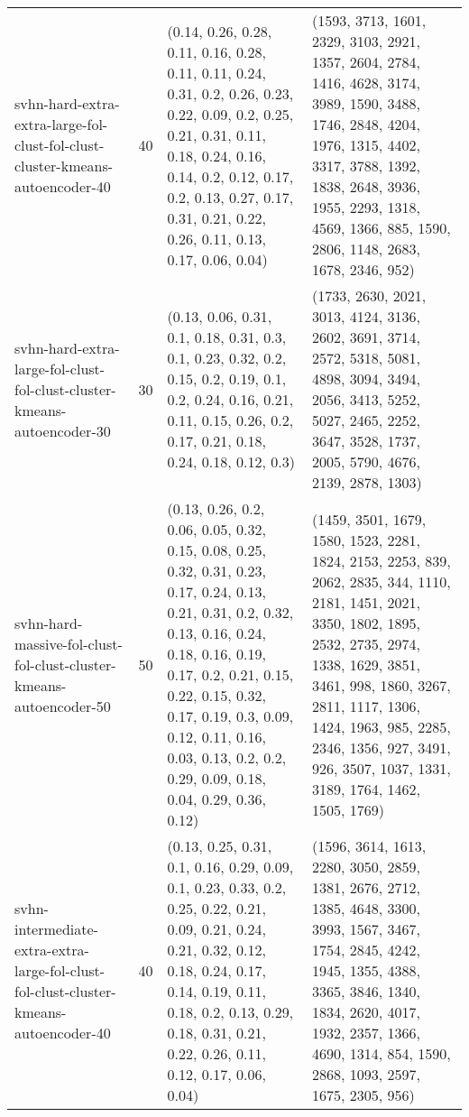 \begin{longtable}{llll}
                                svhn-hard-extra-extra-large-fol-clust-fol-clust-cluster-kmeans-autoencoder-40 &             40 &                                                              (0.14, 0.26, 0.28, 0.11, 0.16, 0.28, 0.11, 0.11, 0.24, 0.31, 0.2, 0.26, 0.23, 0.22, 0.09, 0.2, 0.25, 0.21, 0.31, 0.11, 0.18, 0.24, 0.16, 0.14, 0.2, 0.12, 0.17, 0.2, 0.13, 0.27, 0.17, 0.31, 0.21, 0.22, 0.26, 0.11, 0.13, 0.17, 0.06, 0.04) &                                                            (1593, 3713, 1601, 2329, 3103, 2921, 1357, 2604, 2784, 1416, 4628, 3174, 3989, 1590, 3488, 1746, 2848, 4204, 1976, 1315, 4402, 3317, 3788, 1392, 1838, 2648, 3936, 1955, 2293, 1318, 4569, 1366, 885, 1590, 2806, 1148, 2683, 1678, 2346, 952) \\
                                      svhn-hard-extra-large-fol-clust-fol-clust-cluster-kmeans-autoencoder-30 &             30 &                                                                                                                               (0.13, 0.06, 0.31, 0.1, 0.18, 0.31, 0.3, 0.1, 0.23, 0.32, 0.2, 0.15, 0.2, 0.19, 0.1, 0.2, 0.24, 0.16, 0.21, 0.11, 0.15, 0.26, 0.2, 0.17, 0.21, 0.18, 0.24, 0.18, 0.12, 0.3) &                                                                                                                      (1733, 2630, 2021, 3013, 4124, 3136, 2602, 3691, 3714, 2572, 5318, 5081, 4898, 3094, 3494, 2056, 3413, 5252, 5027, 2465, 2252, 3647, 3528, 1737, 2005, 5790, 4676, 2139, 2878, 1303) \\
                                          svhn-hard-massive-fol-clust-fol-clust-cluster-kmeans-autoencoder-50 &             50 &    (0.13, 0.26, 0.2, 0.06, 0.05, 0.32, 0.15, 0.08, 0.25, 0.32, 0.31, 0.23, 0.17, 0.24, 0.13, 0.21, 0.31, 0.2, 0.32, 0.13, 0.16, 0.24, 0.18, 0.16, 0.19, 0.17, 0.2, 0.21, 0.15, 0.22, 0.15, 0.32, 0.17, 0.19, 0.3, 0.09, 0.12, 0.11, 0.16, 0.03, 0.13, 0.2, 0.2, 0.29, 0.09, 0.18, 0.04, 0.29, 0.36, 0.12) &    (1459, 3501, 1679, 1580, 1523, 2281, 1824, 2153, 2253, 839, 2062, 2835, 344, 1110, 2181, 1451, 2021, 3350, 1802, 1895, 2532, 2735, 2974, 1338, 1629, 3851, 3461, 998, 1860, 3267, 2811, 1117, 1306, 1424, 1963, 985, 2285, 2346, 1356, 927, 3491, 926, 3507, 1037, 1331, 3189, 1764, 1462, 1505, 1769) \\
                        svhn-intermediate-extra-extra-large-fol-clust-fol-clust-cluster-kmeans-autoencoder-40 &             40 &                                                              (0.13, 0.25, 0.31, 0.1, 0.16, 0.29, 0.09, 0.1, 0.23, 0.33, 0.2, 0.25, 0.22, 0.21, 0.09, 0.21, 0.24, 0.21, 0.32, 0.12, 0.18, 0.24, 0.17, 0.14, 0.19, 0.11, 0.18, 0.2, 0.13, 0.29, 0.18, 0.31, 0.21, 0.22, 0.26, 0.11, 0.12, 0.17, 0.06, 0.04) &                                                            (1596, 3614, 1613, 2280, 3050, 2859, 1381, 2676, 2712, 1385, 4648, 3300, 3993, 1567, 3467, 1754, 2845, 4242, 1945, 1355, 4388, 3365, 3846, 1340, 1834, 2620, 4017, 1932, 2357, 1366, 4690, 1314, 854, 1590, 2868, 1093, 2597, 1675, 2305, 956) \\

\end{longtable}
